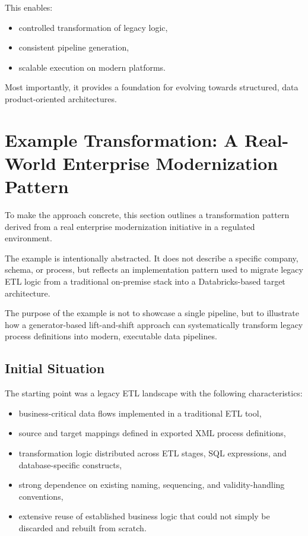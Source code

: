\documentclass[11pt,a4paper]{article}
\begin{document}
This enables:
\begin{itemize}
  \item controlled transformation of legacy logic,
  \item consistent pipeline generation,
  \item scalable execution on modern platforms.
\end{itemize}

Most importantly, it provides a foundation for evolving towards structured, data product-oriented architectures.

\section{Example Transformation: A Real-World Enterprise Modernization Pattern}

To make the approach concrete, this section outlines a transformation pattern derived from a real enterprise modernization initiative in a regulated environment.

The example is intentionally abstracted. It does not describe a specific company, schema, or process, but reflects an implementation pattern used to migrate legacy ETL logic from a traditional on-premise stack into a Databricks-based target architecture.

The purpose of the example is not to showcase a single pipeline, but to illustrate how a generator-based lift-and-shift approach can systematically transform legacy process definitions into modern, executable data pipelines.

\subsection{Initial Situation}

The starting point was a legacy ETL landscape with the following characteristics:
\begin{itemize}
  \item business-critical data flows implemented in a traditional ETL tool,
  \item source and target mappings defined in exported XML process definitions,
  \item transformation logic distributed across ETL stages, SQL expressions, and database-specific constructs,
  \item strong dependence on existing naming, sequencing, and validity-handling conventions,
  \item extensive reuse of established business logic that could not simply be discarded and rebuilt from scratch.
\end{itemize}
\end{document}
